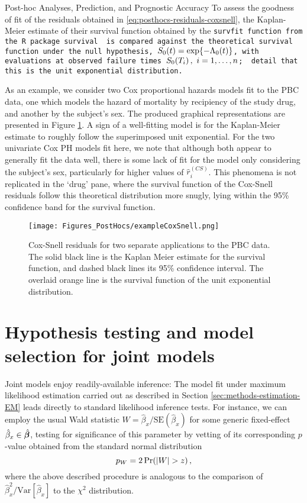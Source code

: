 \begin{chapter}{\label{cha:posthoc}Post-hoc Analyses, Prediction, and Prognostic Accuracy}
To assess the goodness of fit of the residuals obtained in \eqref{eq:posthocs-residuals-coxsnell}, the Kaplan-Meier estimate of their survival function obtained by the \tt{survfit} function from the \tt{R} package \tt{survival} \citep{R-survival} is compared against the theoretical survival function under the null hypothesis, $S_0\!\left( t\right)=\exp\!\left\{-\Lambda_0\!\left( t\right)\right\}$, with evaluations at observed failure times $S_0\lb T_i\rb,\ i=1,\dots,n$; \citet{RizopoulosJMbook} detail that this is the unit exponential distribution.

As an example, we consider two Cox proportional hazards models fit to the PBC data, one which models the hazard of mortality by recipiency of the study drug, and another by the subject's sex. The produced graphical representations are presented in Figure \ref{fig:posthocs-example-coxsnell}. A sign of a well-fitting model is for the Kaplan-Meier estimate to roughly follow the superimposed unit exponential. For the two univariate Cox PH models fit here, we note that although both appear to generally fit the data well, there is some lack of fit for the model only considering the subject's sex, particularly for higher values of $\hat{r}_i^{(CS)}$. This phenomena is not replicated in the `drug' pane, where the survival function of the Cox-Snell residuals follow this theoretical distribution more snugly, lying within the 95\% confidence band for the survival function.

\begin{figure}
    \centering
    \texttt{[image: Figures\_PostHocs/exampleCoxSnell.png]}
    \caption{Cox-Snell residuals for two separate applications to the PBC data. The solid black line is the Kaplan Meier estimate for the survival function, and dashed black lines its 95\% confidence interval. The overlaid orange line is the survival function of the unit exponential distribution.}
    \label{fig:posthocs-example-coxsnell}
\end{figure}

\section{Hypothesis testing and model selection for joint models}\label{sec:posthocs-hypothesis-testing-model-selection}
Joint models enjoy readily-available inference: The model fit under maximum likelihood estimation carried out as described in Section \ref{sec:methods-estimation-EM} leads directly to standard likelihood inference tests. For instance, we can employ the usual Wald statistic $W=\hat{\beta}_x/\mathrm{SE}(\hat{\beta}_x)$ for some generic fixed-effect $\hat{\beta}_x\in\hat{\bm{\beta}}$, testing for significance of this parameter by vetting of its corresponding $p$-value obtained from the standard normal distribution 
\begin{equation*}
    p_{W}=2\Pr\!\left( |W| > z\right),
\end{equation*}
where the above described procedure is analogous to the comparison of $\hat{\beta}_x^2/\mathrm{Var}[\hat{\beta}_x]$ to the $\chi^2$ distribution.


\end{chapter}
